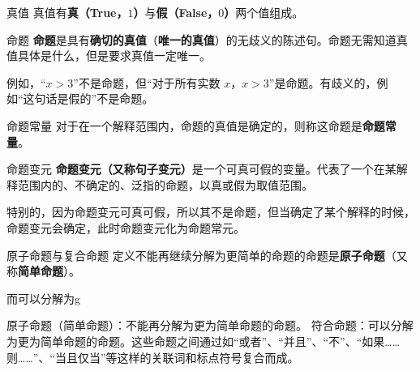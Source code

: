 
\begin{definition}{真值}
真值有\textbf{真（True，$1$）}与\textbf{假（False，$0$）}两个值组成。
\end{definition}

\begin{definition}{命题}
\textbf{命题}是具有\textbf{确切的真值}（\textbf{唯一的真值}）的无歧义的陈述句。命题无需知道真值具体是什么，但是要求真值一定唯一。
\end{definition}
例如，“$x>3$”不是命题，但“对于所有实数 $x$，$x>3$”是命题。有歧义的，例如“这句话是假的”不是命题。



\begin{definition}{命题常量}
对于在一个解释范围内，命题的真值是确定的，则称这命题是\textbf{命题常量}。
\end{definition}
\begin{definition}{命题变元}
\textbf{命题变元（又称句子变元）}是一个可真可假的变量。代表了一个在某解释范围内的、不确定的、泛指的命题，以真或假为取值范围。
\end{definition}
特别的，因为命题变元可真可假，所以其不是命题，但当确定了某个解释的时候，命题变元会确定，此时命题变元化为命题常元。

\begin{definition}{原子命题与复合命题}
定义不能再继续分解为更简单的命题的命题是\textbf{原子命题}（又称\textbf{简单命题}）。

而可以分解为g
\end{definition}

原子命题（简单命题）：不能再分解为更为简单命题的命题。
符合命题：可以分解为更为简单命题的命题。这些命题之间通过如“或者”、“并且”、“不”、“如果……则……”、“当且仅当”等这样的关联词和标点符号复合而成。